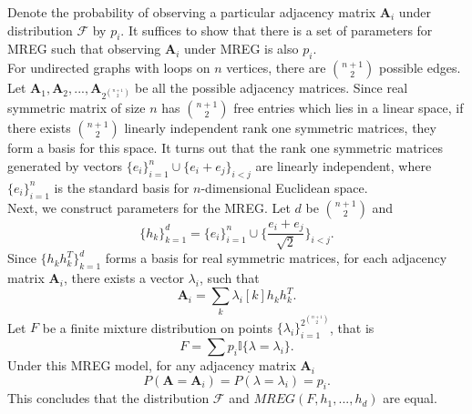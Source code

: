 \documentclass[10pt,journal,compsoc]{IEEEtran}
\newenvironment{proof}[1][Proof]{\begin{trivlist}
		\item[\hskip \labelsep {\bfseries #1}]}{\end{trivlist}}
\newcommand{\bA}{\mathbf{A}}
\begin{document}
\begin{proof} [Proof of Theorem 2.1]
 Denote the probability of observing a particular adjacency matrix $\bA_i$ under distribution $\mathcal{F}$ by $p_i$. It suffices to show that there is a set of parameters for MREG such that observing $\bA_i$ under MREG is also $p_i$. \\
 
 \noindent For undirected graphs with loops on $n$ vertices, there are ${n+1}\choose{2}$ possible edges. Let $\bA_1,\bA_2,...,\bA_{2^{{n+1}\choose{2}}}$ be all the possible adjacency matrices. 
 Since real symmetric matrix of size $n$ has ${n+1}\choose{2}$ free entries which lies in a linear space, if there exists ${n+1}\choose{2}$ linearly independent rank one symmetric matrices, they form a basis for this space. It turns out that the rank one symmetric matrices generated by vectors $\{e_i\}_{i=1}^{n} \cup \{e_i+e_j\}_{i<j}$ are linearly independent, where $\{e_i\}_{i=1}^{n}$ is the standard basis for $n$-dimensional Euclidean space. \\
 
 \noindent Next, we construct parameters for the MREG. Let $d$ be ${n+1}\choose{2} $  and 
 \[\{h_k\}_{k=1}^d = \{e_i\}_{i=1}^{n} \cup \{\frac{e_i+e_j}{\sqrt{2}}\}_{i<j}.\] 
 Since $\{h_k h_k^T\}_{k=1}^d$ forms a basis for real symmetric matrices, for each adjacency matrix $\bA_i$, there exists a vector $\lambda_i$, such that 
 \[\bA_i =\sum_{k} \lambda_i [k] h_k  h_k^T.\] Let $F$ be a finite mixture distribution on points $\{\lambda_i\}_{i=1}^{2^{{n+1}\choose{2}}}$, that is 
 \[F = \sum p_i \mathbb{I} \{\lambda = \lambda_i\}.\]
  Under this MREG model, for any adjacency matrix $\bA_i$
 \[P(\bA=\bA_i) = P(\lambda = \lambda_i) = p_i .\]
 This concludes that the distribution $\mathcal{F}$ and $MREG(F,h_1,...,h_d)$ are equal.
 \end{proof}
\end{document}
